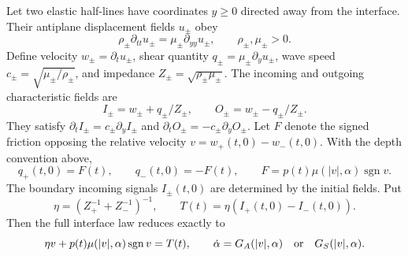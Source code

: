 \documentclass[11pt,a4paper]{article}
\theoremstyle{definition}\newtheorem{definition}[theorem]{Definition}
\theoremstyle{remark}\newtheorem{remark}[theorem]{Remark}
\newcommand{\sgn}{\operatorname{sgn}}
\numberwithin{equation}{section}
\begin{document}
Let two elastic half-lines have coordinates $y\ge0$ directed away from the interface. Their antiplane displacement fields $u_\pm$ obey
\begin{equation}\label{eq:halfwaves}
 \rho_\pm\partial_{tt}u_\pm=\mu_\pm\partial_{yy}u_\pm,
 \qquad \rho_\pm,\mu_\pm>0.
\end{equation}
Define velocity $w_\pm=\partial_tu_\pm$, shear quantity $q_\pm=\mu_\pm\partial_yu_\pm$, wave speed $c_\pm=\sqrt{\mu_\pm/\rho_\pm}$, and impedance $Z_\pm=\sqrt{\rho_\pm\mu_\pm}$. The incoming and outgoing characteristic fields are
\[
 I_\pm=w_\pm+q_\pm/Z_\pm,\qquad
 O_\pm=w_\pm-q_\pm/Z_\pm.
\]
They satisfy $\partial_tI_\pm=c_\pm\partial_yI_\pm$ and
$\partial_tO_\pm=-c_\pm\partial_yO_\pm$.
Let $F$ denote the signed friction opposing the relative velocity
$v=w_+(t,0)-w_-(t,0)$. With the depth convention above,
\begin{equation}\label{eq:interfaceconditions}
 q_+(t,0)=F(t),\qquad q_-(t,0)=-F(t),\qquad
 F=p(t)\mu(|v|,\alpha)\sgn v.
\end{equation}
The boundary incoming signals $I_\pm(t,0)$ are determined by the initial fields. Put
\begin{equation}\label{eq:radiation}
 \eta=\left(Z_+^{-1}+Z_-^{-1}\right)^{-1},\qquad
 T(t)=\eta\left(I_+(t,0)-I_-(t,0)\right).
\end{equation}
Then the full interface law reduces exactly to
\begin{equation}\label{eq:interfaceODE}
 \eta v+p(t)\mu(|v|,\alpha)\sgn v=T(t),\qquad
 \dot\alpha=G_A(|v|,\alpha)\quad\hbox{or}\quad G_S(|v|,\alpha).
\end{equation}
\end{document}
